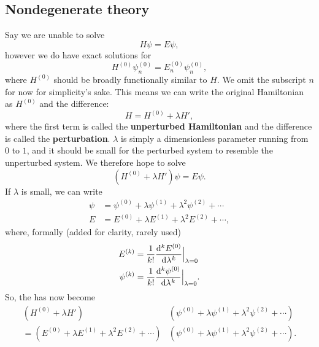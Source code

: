 \subsection{Nondegenerate theory}
Say we are unable to solve
\begin{equation}
H\psi=E\psi,
\end{equation}
however we do have exact solutions for
\begin{equation}
H^{(0)}\psi_n^{(0)}=E_n^{(0)}\psi_n^{(0)}, 
\end{equation}
where $H^{(0)}$ should be broadly functionally similar to $H$. 
We omit the subscript $n$ for now for simplicity's sake. 
This means we can write the original Hamiltonian as $H^{(0)}$ and the difference:
\begin{equation}
H=H^{(0)}+\lambda H',
\end{equation}
where the first term is called the \textbf{unperturbed Hamiltonian} and the 
difference is called the \textbf{perturbation}. $\lambda$ is simply a 
dimensionless parameter running from $0$ to $1$, and it should be small for the 
perturbed system to resemble the unperturbed system. We therefore hope to solve
\begin{equation}
(H^{(0)}+\lambda H')\psi=E\psi.
\end{equation}
If $\lambda$ is small, we can write 
\begin{subequations}
\begin{align}
\psi&=\psi^{(0)}+\lambda\psi^{(1)}+\lambda^2\psi^{(2)}+\cdots\\
E&=E^{(0)}+\lambda E^{(1)}+\lambda^2E^{(2)}+\cdots, 
\end{align}
\end{subequations}
where, formally (added for clarity, rarely used)
\begin{subequations}
\begin{align}
E^{(k)}&=\frac{1}{k!}\diff[k]{E^{(0)}}{\lambda}\Big|_{\lambda=0}\\
\psi^{(k)}&=\frac{1}{k!}\diff[k]{\psi^{(0)}}{\lambda}\Big|_{\lambda=0}.
\end{align}
\end{subequations}
So, the \sch has now become
\begin{equation}
\begin{aligned}
(H^{(0)}+\lambda H')&(\psi^{(0)}+\lambda\psi^{(1)}+\lambda^2\psi^{(2)}+\cdots)\\
=(E^{(0)}+\lambda E^{(1)}+\lambda^2E^{(2)}+\cdots)&(\psi^{(0)}+\lambda\psi^{(1)}+\lambda^2\psi^{(2)}+\cdots).
\end{aligned}
\end{equation}
